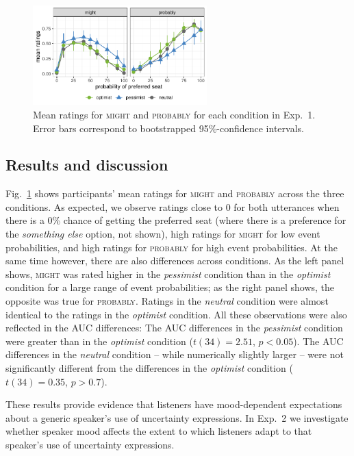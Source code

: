 \documentclass[man,floatsintext]{apa6}
\begin{document}
\begin{figure}[t]
    \centering
    \includegraphics[width=0.6\textwidth]{norming.pdf}
    \caption{Mean ratings for \textsc{might} and \textsc{probably} for each condition in Exp.~1. Error bars correspond to bootstrapped 95\%-confidence intervals.}
    \label{fig:results-exp1}
\end{figure}

\subsection{Results and discussion}

Fig.~\ref{fig:results-exp1} shows participants' mean ratings for \textsc{might} and \textsc{probably} across the three conditions. As expected, we observe ratings close to 0 for both utterances when there is a 0\% chance of getting the preferred seat (where there is a preference for the \textit{something else} option, not shown), high ratings for \textsc{might} for low event probabilities, and high ratings for \textsc{probably} for high event probabilities. At the same time however, there are also differences across conditions. As the left panel shows, \textsc{might} was rated higher in the \textit{pessimist} condition than in the \textit{optimist} condition for a large range of event probabilities; as the right panel shows, the opposite was true for \textsc{probably}. Ratings in the \textit{neutral} condition were almost identical to the ratings in the \textit{optimist} condition. All these observations were also reflected in the AUC differences: The AUC differences in the \textit{pessimist} condition were greater than in the \textit{optimist} condition ($t(34)=2.51$, $p < 0.05$). The AUC differences in the \textit{neutral} condition -- while numerically slightly larger -- were not significantly different from the differences in the \textit{optimist} condition ($t(34)=0.35$, $p>0.7$).

These results provide evidence that listeners have mood-dependent expectations about a generic speaker's use of uncertainty expressions. In Exp.~2 we investigate whether  speaker mood affects the extent to which listeners adapt to that speaker's use of uncertainty expressions.  %
\end{document}
